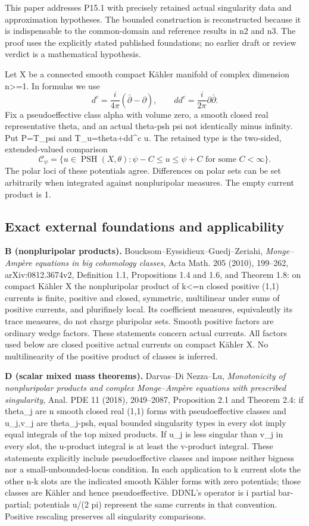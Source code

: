\documentclass[
]{article}
\begin{document}
This paper addresses P15.1 with precisely retained actual singularity
data and approximation hypotheses. The bounded construction is
reconstructed because it is indispensable to the common-domain and
reference results in n2 and n3. The proof uses the explicitly stated
published foundations; no earlier draft or review verdict is a
mathematical hypothesis.

Let X be a connected smooth compact Kähler manifold of complex dimension
n\textgreater=1. In formulas we use \[
d^c=\frac{i}{4\pi}(\bar\partial-\partial),\qquad dd^c=\frac{i}{2\pi}\partial\bar\partial.
\] Fix a pseudoeffective class alpha with volume zero, a smooth closed
real representative theta, and an actual theta-psh psi not identically
minus infinity. Put P=T\_psi and T\_u=theta+dd\^{}c u. The retained type
is the two-sided, extended-valued comparison \[
\mathcal C_\psi=\{u\in\operatorname{PSH}(X,\theta):\psi-C\leq u\leq\psi+C
\text{ for some }C<\infty\}.
\] The polar loci of these potentials agree. Differences on polar sets
can be set arbitrarily when integrated against nonpluripolar measures.
The empty current product is 1.

\subsection{Exact external foundations and
applicability}\label{exact-external-foundations-and-applicability}

\textbf{B (nonpluripolar products).}
Boucksom--Eyssidieux--Guedj--Zeriahi, \emph{Monge--Ampère equations in
big cohomology classes}, Acta Math. 205 (2010), 199--262,
arXiv:0812.3674v2, Definition 1.1, Propositions 1.4 and 1.6, and Theorem
1.8: on compact Kähler X the nonpluripolar product of k\textless=n
closed positive (1,1) currents is finite, positive and closed,
symmetric, multilinear under sums of positive currents, and plurifinely
local. Its coefficient measures, equivalently its trace measures, do not
charge pluripolar sets. Smooth positive factors are ordinary wedge
factors. These statements concern actual currents. All factors used
below are closed positive actual currents on compact Kähler X. No
multilinearity of the positive product of classes is inferred.

\textbf{D (scalar mixed mass theorems).} Darvas--Di Nezza--Lu,
\emph{Monotonicity of nonpluripolar products and complex Monge--Ampère
equations with prescribed singularity}, Anal. PDE 11 (2018), 2049--2087,
Proposition 2.1 and Theorem 2.4: if theta\_j are n smooth closed real
(1,1) forms with pseudoeffective classes and u\_j,v\_j are theta\_j-psh,
equal bounded singularity types in every slot imply equal integrals of
the top mixed products. If u\_j is less singular than v\_j in every
slot, the u-product integral is at least the v-product integral. These
statements explicitly include pseudoeffective classes and impose neither
bigness nor a small-unbounded-locus condition. In each application to k
current slots the other n-k slots are the indicated smooth Kähler forms
with zero potentials; those classes are Kähler and hence
pseudoeffective. DDNL's operator is i partial bar-partial; potentials
u/(2 pi) represent the same currents in that convention. Positive
rescaling preserves all singularity comparisons.
\end{document}
